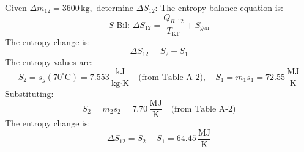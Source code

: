 Given \( \Delta m_{12} = 3600 \, \text{kg}, \) determine \( \Delta S_{12} \):  
The entropy balance equation is:  
\[
S\text{-Bil: } \Delta S_{12} = \frac{Q_{R,12}}{T_{\text{KF}}} + S_{\text{gen}}
\]  
The entropy change is:  
\[
\Delta S_{12} = S_2 - S_1
\]  
The entropy values are:  
\[
S_2 = s_g(70^\circ\text{C}) = 7.553 \, \frac{\text{kJ}}{\text{kg·K}} \quad \text{(from Table A-2)}, \quad S_1 = m_1 s_1 = 72.55 \, \frac{\text{MJ}}{\text{K}}
\]  
Substituting:  
\[
S_2 = m_2 s_2 = 7.70 \, \frac{\text{MJ}}{\text{K}} \quad \text{(from Table A-2)}
\]  
The entropy change is:  
\[
\Delta S_{12} = S_2 - S_1 = 64.45 \, \frac{\text{MJ}}{\text{K}}
\]